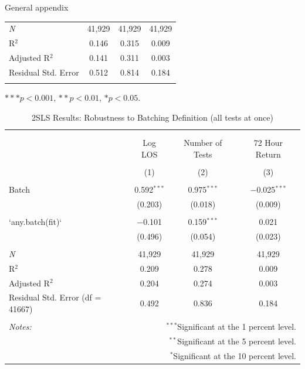 \documentclass[,,nonblindrev]{informs}
\begin{document}
\begin{APPENDIX}{General appendix}
\begin{table}[!htbp]
\begin{tabular}{@{\extracolsep{10pt}}lccc}
\textit{N} & 41,929 & 41,929 & 41,929 \\ 
R$^{2}$ & 0.146 & 0.315 & 0.009 \\ 
Adjusted R$^{2}$ & 0.141 & 0.311 & 0.003 \\ 
Residual Std. Error & 0.512 & 0.814 & 0.184 \\ 
\hline 
\hline \\[-1.8ex] 
\end{tabular}
\begin{tablenotes}
\small
\item $*** p < 0.001$, $** p < 0.01$, $* p < 0.05$.
\end{tablenotes}
\end{table}

\newpage

\begin{table}[!htbp] \centering 
  \caption{2SLS Results: Robustness to Batching Definition (all tests at once)} 
  \label{tab:robustness_batching2} 
  
\begin{tabular}{@{\extracolsep{5pt}}lccc} 
\\[-1.8ex]\hline 
\hline \\[-1.8ex] 
\\[-1.8ex] & Log LOS & Number of Tests & 72 Hour Return \\ 
\\[-1.8ex] & (1) & (2) & (3)\\ 
\hline \\[-1.8ex] 
 Batch & 0.592$^{***}$ & 0.975$^{***}$ & $-$0.025$^{***}$ \\ 
  & (0.203) & (0.018) & (0.009) \\ 
  & & & \\ 
 `any.batch(fit)` & $-$0.101 & 0.159$^{***}$ & 0.021 \\ 
  & (0.496) & (0.054) & (0.023) \\ 
  & & & \\ 
\textit{N} & 41,929 & 41,929 & 41,929 \\ 
R$^{2}$ & 0.209 & 0.278 & 0.009 \\ 
Adjusted R$^{2}$ & 0.204 & 0.274 & 0.003 \\ 
Residual Std. Error (df = 41667) & 0.492 & 0.836 & 0.184 \\ 
\hline 
\hline \\[-1.8ex] 
\textit{Notes:} & \multicolumn{3}{r}{$^{***}$Significant at the 1 percent level.} \\ 
 & \multicolumn{3}{r}{$^{**}$Significant at the 5 percent level.} \\ 
 & \multicolumn{3}{r}{$^{*}$Significant at the 10 percent level.} \\ 
\end{tabular} 
\end{table}


\end{APPENDIX}
\end{document}
